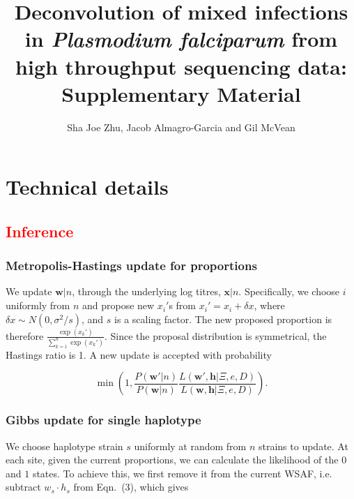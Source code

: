 \documentclass{article}
\title{Deconvolution of mixed infections in {\it Plasmodium falciparum} from high throughput sequencing data: Supplementary Material}
\author{Sha Joe Zhu, Jacob Almagro-Garcia and Gil McVean}
\date{}
\begin{document}
\listoftodos
\clearpage
\setcounter{page}{1}

\maketitle
\tableofcontents

\setcounter{section}{0}

\newpage



\section{Technical details} \label{sup:sec:alg}

\subsection{\textcolor{red}{Inference}}
\subsubsection{Metropolis-Hastings update for proportions}\label{sec:updateP}

We update $\mathbf{w}|n$, through the underlying log titres, $\mathbf{x}|n$. Specifically, we choose $i$ uniformly from $n$ and propose new $x_i'$s from $x_i' = x_i + \delta x$, where $\delta x \sim N(0, \sigma^2/s)$, and $s$ is a scaling factor. The new proposed proportion is therefore $\frac{\exp(x_k')}{\sum_{k=1}^n \exp(x_k')}$. Since the proposal distribution is symmetrical, the Hastings ratio is 1. A new update is accepted with probability

 $$\min\left(1, \frac{P(\mathbf{w}'|n)}{P(\mathbf{w}|n)} \frac{L(\mathbf{w}', \mathbf{h} | \Xi, e, D)}{L(\mathbf{w}, \mathbf{h} | \Xi, e, D)}\right).$$



\subsubsection{Gibbs update for single haplotype}

We choose haplotype strain $s$ uniformly at random from $n$ strains to update.  At each site, given the current proportions, we can calculate the likelihood of the $0$ and $1$ states.  To achieve this, we first remove it from the current WSAF, i.e. subtract $ w_s \cdot h_s$ from Eqn.~(3), which gives
\end{document}
